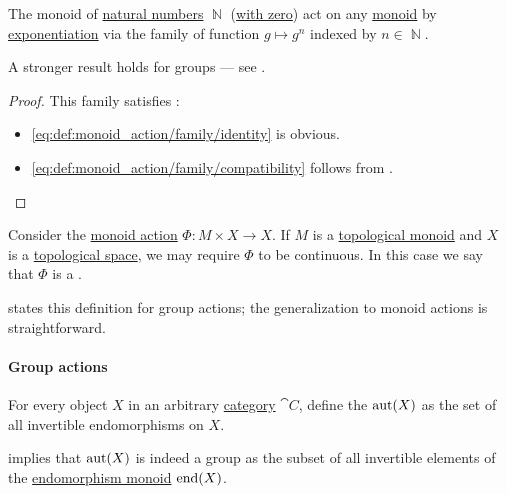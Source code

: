 \begin{proposition}\label{thm:exponentiation_monoid_action}
  The monoid of \hyperref[def:natural_numbers]{natural numbers} \( \BbbN \) (\hyperref[rem:peano_arithmetic_zero]{with zero}) act on any \hyperref[def:monoid]{monoid} by \hyperref[def:monoid/exponentiation]{exponentiation} via the family of function \( g \mapsto g^n \) indexed by \( n \in \BbbN \).
\end{proposition}
\begin{comments}
  \item A stronger result holds for groups --- see .
\end{comments}
\begin{proof}
  This family satisfies :
  \begin{itemize}
    \item \ref{eq:def:monoid_action/family/identity} is obvious.
    \item \ref{eq:def:monoid_action/family/compatibility} follows from .
  \end{itemize}
\end{proof}

\begin{definition}\label{def:continuous_monoid_action}
  Consider the \hyperref[def:monoid_action]{monoid action} \( \Phi: M \times X \to X \). If \( M \) is a \hyperref[def:topological_semigroup]{topological monoid} and \( X \) is a \hyperref[def:topological_space]{topological space}, we may require \( \Phi \) to be continuous. In this case we say that \( \Phi \) is a .
\end{definition}
\begin{comments}
  \item {} states this definition for group actions; the generalization to monoid actions is straightforward.
\end{comments}

\paragraph{Group actions}

\begin{definition}\label{def:automorphism_group}
  For every object \( X \) in an arbitrary \hyperref[def:category]{category} \( \cat{C} \), define the  \( \operatorname{aut}(X) \) as the set of all invertible endomorphisms on \( X \).
\end{definition}
\begin{defproof}
   implies that \( \operatorname{aut}(X) \) is indeed a group as the subset of all invertible elements of the \hyperref[def:endomorphism_monoid]{endomorphism monoid} \( \operatorname{end}(X) \).
\end{defproof}

